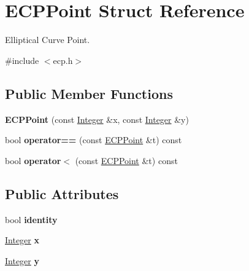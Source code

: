 \hypertarget{struct_e_c_p_point}{
\section{ECPPoint Struct Reference}
\label{struct_e_c_p_point}
}


Elliptical Curve Point.  


{\ttfamily \#include $<$ecp.h$>$}\subsection*{Public Member Functions}
\begin{DoxyCompactItemize}
\item 
\hypertarget{struct_e_c_p_point_ac68bc9990c364313b6798669de55343f}{
{\bfseries ECPPoint} (const \hyperlink{class_integer}{Integer} \&x, const \hyperlink{class_integer}{Integer} \&y)}
\label{struct_e_c_p_point_ac68bc9990c364313b6798669de55343f}

\item 
\hypertarget{struct_e_c_p_point_a78988d351554f25761ca313c1d1d17e1}{
bool {\bfseries operator==} (const \hyperlink{struct_e_c_p_point}{ECPPoint} \&t) const }
\label{struct_e_c_p_point_a78988d351554f25761ca313c1d1d17e1}

\item 
\hypertarget{struct_e_c_p_point_afda11fc53c7a05a6980d0f333739c2f7}{
bool {\bfseries operator$<$} (const \hyperlink{struct_e_c_p_point}{ECPPoint} \&t) const }
\label{struct_e_c_p_point_afda11fc53c7a05a6980d0f333739c2f7}

\end{DoxyCompactItemize}
\subsection*{Public Attributes}
\begin{DoxyCompactItemize}
\item 
\hypertarget{struct_e_c_p_point_a806dedcf077e22de7904ccfd7987bcf9}{
bool {\bfseries identity}}
\label{struct_e_c_p_point_a806dedcf077e22de7904ccfd7987bcf9}

\item 
\hypertarget{struct_e_c_p_point_a24bbcc7eb375ebe2b46d2ac9ee6bb0a8}{
\hyperlink{class_integer}{Integer} {\bfseries x}}
\label{struct_e_c_p_point_a24bbcc7eb375ebe2b46d2ac9ee6bb0a8}

\item 
\hypertarget{struct_e_c_p_point_ab47b82046f543e809bd90d78bf2c85bf}{
\hyperlink{class_integer}{Integer} {\bfseries y}}
\label{struct_e_c_p_point_ab47b82046f543e809bd90d78bf2c85bf}

\end{DoxyCompactItemize}


